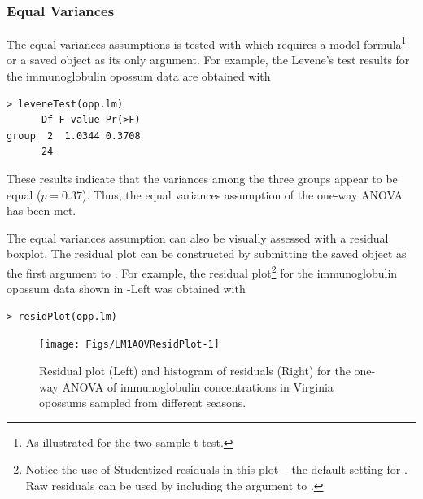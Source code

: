 \documentclass[10pt,openany]{book}\usepackage[]{graphicx}\usepackage[]{color}
\makeatletter
\newenvironment{kframe}{%
 \def\at@end@of@kframe{}%
 \ifinner\ifhmode%
  \def\at@end@of@kframe{\end{minipage}}%
  \begin{minipage}{\columnwidth}%
 \fi\fi%
 \def\FrameCommand##1{\hskip\@totalleftmargin \hskip-\fboxsep
 \colorbox{shadecolor}{##1}\hskip-\fboxsep
     \hskip-\linewidth \hskip-\@totalleftmargin \hskip\columnwidth}%
 \MakeFramed {\advance\hsize-\width
   \@totalleftmargin\z@ \linewidth\hsize
   \@setminipage}}%
 {\par\unskip\endMakeFramed%
 \at@end@of@kframe}
\newenvironment{knitrout}{}{} %
\makeatother
\begin{document}
\subsubsection*{Equal Variances}
The equal variances assumptions is tested with  which requires a model formula\footnote{As illustrated for the two-sample t-test.} or a saved  object as its only argument.  For example, the Levene's test results for the immunoglobulin opossum data are obtained with

\begin{knitrout}
\color{fgcolor}\begin{kframe}
\begin{verbatim}
> leveneTest(opp.lm)
      Df F value Pr(>F)
group  2  1.0344 0.3708
      24               
\end{verbatim}
\end{kframe}
\end{knitrout}

These results indicate that the variances among the three groups appear to be equal ($p=0.37$).  Thus, the equal variances assumption of the one-way ANOVA has been met.

The equal variances assumption can also be visually assessed with a residual boxplot.  The residual plot can be constructed by submitting the saved  object as the first argument to .  For example, the residual plot\footnote{Notice the use of Studentized residuals in this plot -- the default setting for .  Raw residuals can be used by including the  argument to .} for the immunoglobulin opossum data shown in -Left was obtained with

\begin{knitrout}
\color{fgcolor}\begin{kframe}
\begin{verbatim}
> residPlot(opp.lm)
\end{verbatim}
\end{kframe}\begin{figure}[!h]

{\centering \texttt{[image: Figs/LM1AOVResidPlot-1]} 

}

\caption[Residual plot (Left) and histogram of residuals (Right) for the one-way ANOVA of immunoglobulin concentrations in Virginia opossums sampled from different seasons]{Residual plot (Left) and histogram of residuals (Right) for the one-way ANOVA of immunoglobulin concentrations in Virginia opossums sampled from different seasons.}\label{fig:LM1AOVResidPlot}
\end{figure}


\end{knitrout}
\end{document}

